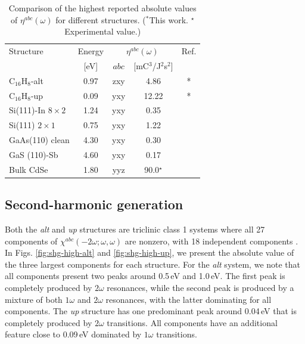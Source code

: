 \documentclass[pss]{wiley2sp} %
\begin{document}
\begin{table}%
\centering
\sidecaption
\begin{tabular}{lcccc}
\hline
\hline
Structure & Energy &  \multicolumn{2}{c}{$\eta^{abc}(\omega)$} &  Ref.\\
\cline{3-4}
          & [eV]   & $abc$ & [mC$^{3}$/J$^{2}$s$^{2}$] \\
\hline
C$_{16}$H$_{8}$-alt     & 0.97  & zxy & 4.86  & *     \\
C$_{16}$H$_{8}$-up      & 0.09  & yxy & 12.22 & *     \\
Si(111)-In $8\times2$   & 1.24  & yxy & 0.35  & \cite{arzatePRB14}  \\
Si(111) $2\times1$      & 0.75  & yxy & 1.22  & \cite{cabellosPRB11} \\
GaAs(110) clean         & 4.30  & yxy & 0.30  & \cite{cabellosPRB11}     \\
GaS (110)-Sb            & 4.60  & yxy & 0.17  & \cite{cabellosPRB11}\\
Bulk CdSe               & 1.80  & yyz & 90.0$^{\star}$  & \cite{lamanAPL99}\\
\hline
\hline
\end{tabular}
\caption[]{%
Comparison of the highest reported absolute values of {$\eta^{abc}(\omega)$}
for different structures. ($^{*}$This work. $^{\star}$Experimental value.)}
\label{tab:etacomp}
\end{table}


\subsection{Second-harmonic generation}

Both the \emph{alt} and \emph{up} structures are triclinic class 1 systems
where all 27 components of $\chi^{abc}(-2\omega;\omega,\omega)$ are nonzero,
with 18 independent components \cite{popovbook}. In Figs. 
\ref{fig:shg-high-alt} and \ref{fig:shg-high-up}, we present the absolute value
of the three largest components for each structure. For the \emph{alt} system,
we note that all components present two peaks around 0.5\,eV and 1.0\,eV. The
first peak is completely produced by $2\omega$ resonances, while the second
peak is produced by a mixture of both $1\omega$ and $2\omega$ resonances, with
the latter dominating for all components. The \emph{up} structure  has one
predominant peak around 0.04\,eV that is completely produced by $2\omega$
transitions. All components have an additional feature close to 0.09\,eV
dominated by $1\omega$ transitions.
\end{document}
